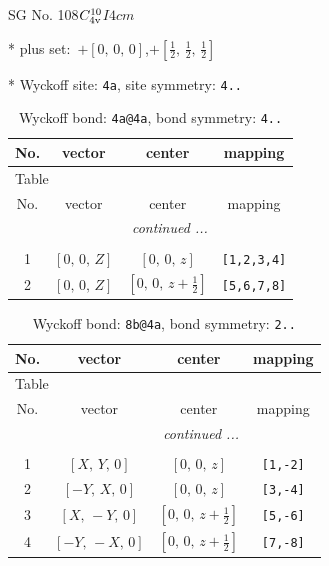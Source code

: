 \documentclass[fleqn,8pt]{jsarticle}
\begin{document}
\setcounter{MaxMatrixCols}{32}

\renewcommand{\tablename}{Table~}
\renewcommand{\figurename}{Figure~}
\begin{center}
\LARGE
SG No. 108\quad$C_{\rm 4v}^{10}$\quad$I4cm$\quad[ tetragonal ]
\end{center}

* plus set:\,\,\,$+\left[ 0,\, 0,\, 0 \right]$,\quad $+\left[ \frac{1}{2},\, \frac{1}{2},\, \frac{1}{2} \right]$


* Wyckoff site: {\tt 4a}, site symmetry: {\tt 4..}
\renewcommand{\arraystretch}{1.2}
\begin{longtable}{cccc}
\caption{Wyckoff bond: {\tt 4a@4a}, bond symmetry: {\tt 4..}}
 \\
 \hline \hline
No. & vector & center & mapping \\ \hline \endfirsthead

\multicolumn{3}{l}{\tablename\ \thetable{}} \\
 \hline \hline
No. & vector & center & mapping \\ \hline \endhead

 \hline \hline
\multicolumn{3}{r}{\footnotesize\it continued ...} \\ \endfoot

 \hline \hline
\multicolumn{3}{r}{} \\ \endlastfoot

1 & $\left[ 0,\, 0,\, Z \right]$ & $\left[ 0,\, 0,\, z \right]$ & {\tt [1,2,3,4]} \\ \hline
2 & $\left[ 0,\, 0,\, Z \right]$ & $\left[ 0,\, 0,\, z + \frac{1}{2} \right]$ & {\tt [5,6,7,8]} \\
\end{longtable}
\renewcommand{\arraystretch}{1.2}
\begin{longtable}{cccc}
\caption{Wyckoff bond: {\tt 8b@4a}, bond symmetry: {\tt 2..}}
 \\
 \hline \hline
No. & vector & center & mapping \\ \hline \endfirsthead

\multicolumn{3}{l}{\tablename\ \thetable{}} \\
 \hline \hline
No. & vector & center & mapping \\ \hline \endhead

 \hline \hline
\multicolumn{3}{r}{\footnotesize\it continued ...} \\ \endfoot

 \hline \hline
\multicolumn{3}{r}{} \\ \endlastfoot

1 & $\left[ X,\, Y,\, 0 \right]$ & $\left[ 0,\, 0,\, z \right]$ & {\tt [1,-2]} \\ \hline
2 & $\left[ - Y,\, X,\, 0 \right]$ & $\left[ 0,\, 0,\, z \right]$ & {\tt [3,-4]} \\ \hline
3 & $\left[ X,\, - Y,\, 0 \right]$ & $\left[ 0,\, 0,\, z + \frac{1}{2} \right]$ & {\tt [5,-6]} \\ \hline
4 & $\left[ - Y,\, - X,\, 0 \right]$ & $\left[ 0,\, 0,\, z + \frac{1}{2} \right]$ & {\tt [7,-8]} \\
\end{longtable}
\end{document}
